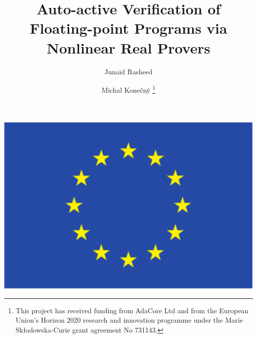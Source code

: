 \documentclass[runningheads]{llncs}
\begin{document}
\setbox\euflagbox\hbox{\includegraphics[scale=0.04]{eu-flag-cropped.pdf}}

%
\title{Auto-active Verification of Floating-point Programs via Nonlinear Real Provers}

%
\author{Junaid Rasheed
\and
Michal Konečný
\thanks{%
This project has received funding from AdaCore Ltd and from \euflag{} the European Union’s Horizon 2020 research and innovation
programme under the Marie Skłodowska-Curie grant agreement No 731143.}
}
%
\end{document}

